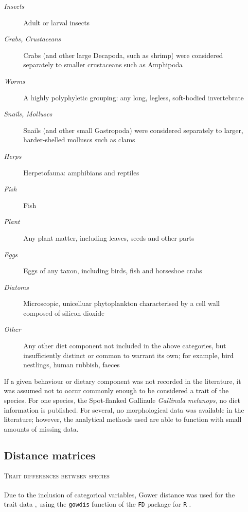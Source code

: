 \documentclass[12pt,a4paper]{book}
\begin{document}
\begin{description}
\item[\textit{Insects}] Adult or larval insects
\item[\textit{Crabs, Crustaceans}] Crabs (and other large Decapoda, such as shrimp) were considered separately to smaller crustaceans such as Amphipoda
\item[\textit{Worms}] A highly polyphyletic grouping: any long, legless, soft-bodied invertebrate
\item[\textit{Snails, Molluscs}] Snails (and other small Gastropoda) were considered separately to larger, harder-shelled molluscs such as clams
\item[\textit{Herps}] Herpetofauna: amphibians and reptiles
\item[\textit{Fish}] Fish
\item[\textit{Plant}] Any plant matter, including leaves, seeds and other parts
\item[\textit{Eggs}] Eggs of any taxon, including birds, fish and horseshoe crabs
\item[\textit{Diatoms}] Microscopic, unicelluar phytoplankton characterised by a cell wall composed of silicon dioxide
\item[\textit{Other}] Any other diet component not included in the above categories, but insufficiently distinct or common to warrant its own; for example, bird nestlings, human rubbish, faeces
\end{description}

If a given behaviour or dietary component was not recorded in the literature, it was assumed not to occur commonly enough to be considered a trait of the species. For one species, the Spot-flanked Gallinule \textit{Gallinula melanops}, no diet information is published. For several, no morphological data was available in the literature; however, the analytical methods used are able to function with small amounts of missing data.

\subsection{Distance matrices}

\textsc{Trait differences between species}\\
\\
Due to the inclusion of categorical variables, Gower distance was used for the trait data \citep{Borcard2011}, using the \texttt{gowdis} function of the \texttt{FD} package for \texttt{R} \citep{Laliberte2014}. 
\end{document}
